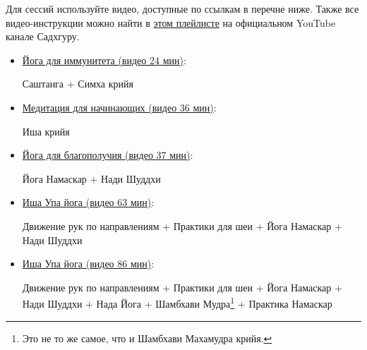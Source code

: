 Для сессий используйте видео, доступные по ссылкам в перечне ниже. Также все видео-инструкции можно найти в \href{https://youtube.com/playlist?list=PLnqgRgprlYQgJwgTSo8M29l0aJHQG2Efg}{этом плейлисте} на официальном YouTube канале Садхгуру.
\begin{itemize}
\item \href{https://drive.google.com/file/d/1OKuzlk67PiygUcywCozbgIGB38TLH6sv/view?usp=sharing}{Йога для иммунитета (видео 24 мин)}: 

    Саштанга + Симха крийя

\item \href{https://drive.google.com/file/d/1ONdlaZQIkNHkhtjV2z1Zkuut3AXz9Fys/view?usp=sharing}{Медитация для начинающих (видео 36 мин)}: 

    Иша крийя

\item \href{https://drive.google.com/file/d/1ONYEw1Z5vYU1K8JGLy2UkQTufU0hSr7u/view?usp=sharing}{Йога для благополучия (видео 37 мин)}: 

    Йога Намаскар + Нади Шуддхи


\item \href{https://drive.google.com/file/d/1O04lLBSqTakuITimFwo7eY6tpjlL3JV-/view?usp=sharing}{Иша Упа йога (видео 63 мин)}: 

    Движение рук по направлениям + Практики для шеи + Йога Намаскар + Нади Шуддхи
    

\item \href{https://youtu.be/Gseq7N49-JI}{Иша Упа йога (видео 86 мин)}: 

    Движение рук по направлениям + Практики для шеи + Йога Намаскар + Нади Шуддхи + Нада Йога + Шамбхави Мудра\footnote{Это не то же самое, что и Шамбхави Махамудра крийя.} + Практика Намаскар
\end{itemize}

